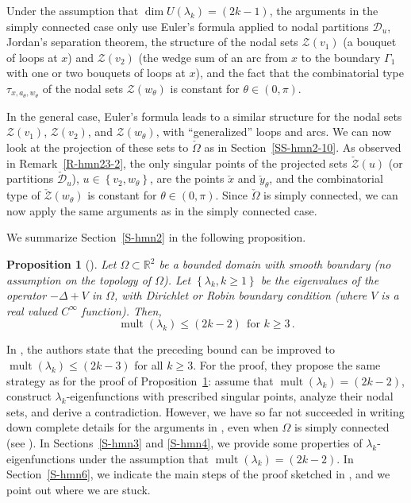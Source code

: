 \documentclass[12pt,a4paper]{amsart}
\theoremstyle{plain} %
\newtheorem{proposition}[theorem]{Proposition}
\theoremstyle{definition}
\numberwithin{equation}{section}
\numberwithin{figure}{section}
\numberwithin{table}{section}
\newcommand{\R}{\mathbb{R}}
\newcommand{\cD}{\mathcal{D}}
\newcommand{\cZ}{\mathcal{Z}}
\DeclareMathOperator{\mult}{mult}
\newcommand{\set}[1]{\left\lbrace #1 \right\rbrace}
\begin{document}
Under the assumption that $\dim U(\lambda_k) = (2k-1)$, the arguments in the simply connected case only use Euler's formula applied to nodal partitions $\cD_u$, Jordan's separation theorem, the structure of the nodal sets $\cZ(v_1)$ (a bouquet of loops at $x$) and $\cZ(v_2)$ (the wedge sum of an arc from $x$ to the boundary $\Gamma_1$ with one or two bouquets  of loops at $x$), and the fact that the combinatorial type  $\tau_{x,a_{\theta},w_{\theta}}$ of the nodal sets $\cZ(w_{\theta})$ is constant for $\theta \in (0,\pi)$.\smallskip

In the general case, Euler's formula leads to a similar structure for the nodal sets $\cZ(v_1)$, $\cZ(v_2)$, and $\cZ(w_{\theta})$, with ``generalized'' loops and arcs. We can now look at the projection of these sets to $\check{\Omega}$ as in Section~\ref{SS-hmn2-10}. As observed in Remark~\ref{R-hmn23-2}, the only singular points of the projected sets $\check{\cZ}(u)$ (or partitions $\check{\cD}_u$), $u \in \set{v_2, w_{\theta}}$, are the points $\check{x}$ and $ \check{y}_{\theta}$, and the combinatorial type of $\check{\cZ}(w_{\theta})$ is constant for $\theta \in (0,\pi)$. Since $\check{\Omega}$ is simply connected, we can now apply the same arguments as in the simply connected case.\medskip


We summarize Section~\ref{S-hmn2} in the following proposition.

\begin{proposition}[\cite{HoMN1999}]\label{P-hmn-s2}
Let $\Omega \subset \R^2$ be a bounded domain with smooth boundary (no assumption on the topology of $\Omega$). Let $\set{\lambda_k, k\ge 1}$ be the eigenvalues of the operator $-\Delta + V$ in $\Omega$, with Dirichlet or Robin boundary condition  (where $V$ is a real valued $C^{\infty}$ function). Then,
\begin{equation*}
\mult(\lambda_k) \le (2k-2)~~  \text{for~}k \ge 3  \,.
\end{equation*}
\end{proposition}%


In \cite[Theorem~B, p.~1172]{HoMN1999}, the authors state that the preceding bound can be improved to $\mult(\lambda_k) \le (2k-3)$ for all $k\ge 3$. For the proof, they propose the same strategy as for the proof of Proposition~\ref{P-hmn-s2}: assume that $\mult(\lambda_k) = (2k-2)$, construct $\lambda_k$-eigenfunctions with prescribed singular points, analyze their nodal sets, and derive a contradiction. However, we have so far not succeeded in writing down complete details for the arguments in \cite{HoMN1999}, even when $\Omega$ is simply connected (see \cite[Section~4]{Berd2018}). In Sections~\ref{S-hmn3} and \ref{S-hmn4}, we provide some properties of $\lambda_k$-eigenfunctions under the assumption that $\mult(\lambda_k) = (2k-2)$. In Section~\ref{S-hmn6}, we indicate the main steps of the proof sketched in \cite[Section~3]{HoMN1999}, and we point out where we are stuck.
\end{document}

